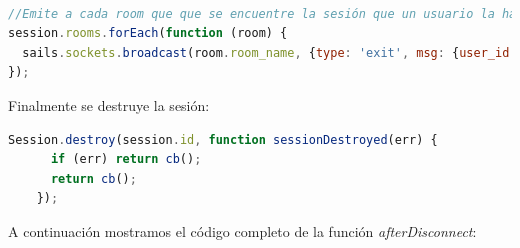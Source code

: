 \begin{lstlisting}[language=JavaScript]

//Emite a cada room que que se encuentre la sesión que un usuario la ha abandonado
session.rooms.forEach(function (room) {
  sails.sockets.broadcast(room.room_name, {type: 'exit', msg: {user_id: session.user_id}});
});

\end{lstlisting}

Finalmente se destruye la sesión:\\

\begin{lstlisting}[language=JavaScript]
    Session.destroy(session.id, function sessionDestroyed(err) {
      if (err) return cb();
      return cb();
    });
\end{lstlisting}


A continuación mostramos el código completo de la función \emph{afterDisconnect}:\\


